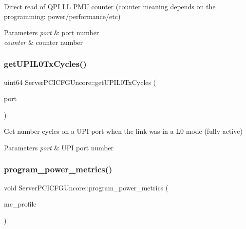 Direct read of Q\+PI LL P\+MU counter (counter meaning depends on the programming\+: power/performance/etc) 


\begin{DoxyParams}{Parameters}
{\em port} & port number \\
\hline
{\em counter} & counter number \\
\hline
\end{DoxyParams}
\mbox{\label{class_server_p_c_i_c_f_g_uncore_aa7938ac7c048915bd256a3c5a5538701}} 
\subsubsection{\texorpdfstring{get\+U\+P\+I\+L0\+Tx\+Cycles()}{getUPIL0TxCycles()}}
{\footnotesize\ttfamily uint64 Server\+P\+C\+I\+C\+F\+G\+Uncore\+::get\+U\+P\+I\+L0\+Tx\+Cycles (\begin{DoxyParamCaption}\item[{uint32}]{port }\end{DoxyParamCaption})}



Get number cycles on a U\+PI port when the link was in a L0 mode (fully active) 


\begin{DoxyParams}{Parameters}
{\em port} & U\+PI port number \\
\hline
\end{DoxyParams}
\mbox{\label{class_server_p_c_i_c_f_g_uncore_af53af91d9172cd124e455e500d6c5622}} 
\subsubsection{\texorpdfstring{program\+\_\+power\+\_\+metrics()}{program\_power\_metrics()}}
{\footnotesize\ttfamily void Server\+P\+C\+I\+C\+F\+G\+Uncore\+::program\+\_\+power\+\_\+metrics (\begin{DoxyParamCaption}\item[{int}]{mc\+\_\+profile }\end{DoxyParamCaption})}



